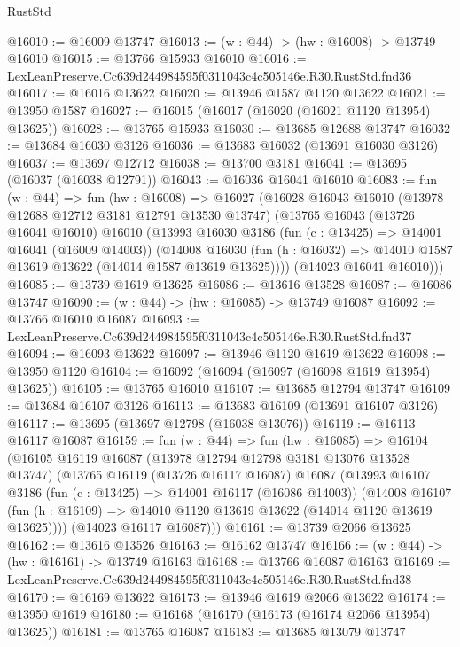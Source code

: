 \begin{lexlean}{RustStd}
\begin{coremodule}
@16010 := @16009 @13747
@16013 := (w : @44) -> (hw : @16008) -> @13749 @16010
@16015 := @13766 @15933 @16010
@16016 := LexLeanPreserve.Cc639d244984595f0311043c4c505146e.R30.RustStd.fnd36
@16017 := @16016 @13622
@16020 := @13946 @1587 @1120 @13622
@16021 := @13950 @1587
@16027 := @16015 (@16017 (@16020 (@16021 @1120 @13954) @13625))
@16028 := @13765 @15933
@16030 := @13685 @12688 @13747
@16032 := @13684 @16030 @3126
@16036 := @13683 @16032 (@13691 @16030 @3126)
@16037 := @13697 @12712
@16038 := @13700 @3181
@16041 := @13695 (@16037 (@16038 @12791))
@16043 := @16036 @16041 @16010
@16083 := fun (w : @44) =>
  fun (hw : @16008) =>
  @16027
    (@16028
      @16043
      @16010
      (@13978 @12688 @12712 @3181 @12791 @13530 @13747)
      (@13765
        @16043
        (@13726 @16041 @16010)
        @16010
        (@13993
          @16030
          @3186
          (fun (c : @13425) => @14001 @16041 (@16009 @14003))
          (@14008
            @16030
            (fun (h : @16032) => @14010 @1587 @13619 @13622 (@14014 @1587 @13619 @13625))))
        (@14023 @16041 @16010)))
@16085 := @13739 @1619 @13625
@16086 := @13616 @13528
@16087 := @16086 @13747
@16090 := (w : @44) -> (hw : @16085) -> @13749 @16087
@16092 := @13766 @16010 @16087
@16093 := LexLeanPreserve.Cc639d244984595f0311043c4c505146e.R30.RustStd.fnd37
@16094 := @16093 @13622
@16097 := @13946 @1120 @1619 @13622
@16098 := @13950 @1120
@16104 := @16092 (@16094 (@16097 (@16098 @1619 @13954) @13625))
@16105 := @13765 @16010
@16107 := @13685 @12794 @13747
@16109 := @13684 @16107 @3126
@16113 := @13683 @16109 (@13691 @16107 @3126)
@16117 := @13695 (@13697 @12798 (@16038 @13076))
@16119 := @16113 @16117 @16087
@16159 := fun (w : @44) =>
  fun (hw : @16085) =>
  @16104
    (@16105
      @16119
      @16087
      (@13978 @12794 @12798 @3181 @13076 @13528 @13747)
      (@13765
        @16119
        (@13726 @16117 @16087)
        @16087
        (@13993
          @16107
          @3186
          (fun (c : @13425) => @14001 @16117 (@16086 @14003))
          (@14008
            @16107
            (fun (h : @16109) => @14010 @1120 @13619 @13622 (@14014 @1120 @13619 @13625))))
        (@14023 @16117 @16087)))
@16161 := @13739 @2066 @13625
@16162 := @13616 @13526
@16163 := @16162 @13747
@16166 := (w : @44) -> (hw : @16161) -> @13749 @16163
@16168 := @13766 @16087 @16163
@16169 := LexLeanPreserve.Cc639d244984595f0311043c4c505146e.R30.RustStd.fnd38
@16170 := @16169 @13622
@16173 := @13946 @1619 @2066 @13622
@16174 := @13950 @1619
@16180 := @16168 (@16170 (@16173 (@16174 @2066 @13954) @13625))
@16181 := @13765 @16087
@16183 := @13685 @13079 @13747

\end{coremodule}
\end{lexlean}
